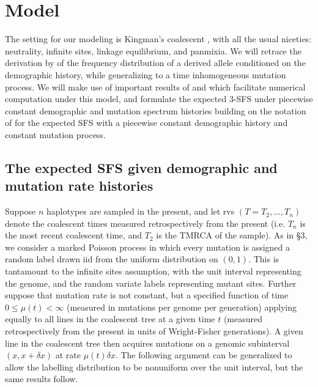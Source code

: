 \documentclass[11pt]{article}
\begin{document}
\section{Model}\label{sec:model}

The setting for our modeling is Kingman's coalescent \citep{Kingman1982-ge, Kingman1982-tf, Kingman1982-ys, Kingman2000-jr}, with all the usual niceties: neutrality, infinite sites, linkage equilibrium, and panmixia.
We will retrace the derivation by \cite{Griffiths1998-qf} of the frequency distribution of a derived allele conditioned on the demographic history, while generalizing to a time inhomogeneous mutation process.
We will make use of important results of \cite{Polanski2003-kg} and \cite{Polanski2003-ll} which facilitate numerical computation under this model, and formulate the expected 3-SFS under piecewise constant demographic and mutation spectrum histories building on the notation of \cite{Rosen2018-bb} for the expected SFS with a piecewise constant demographic history and constant mutation process.

\subsection{The expected SFS given demographic and mutation rate histories}\label{sec:model:xi}

Suppose $n$ haplotypes are sampled in the present, and let rvs $(T = T_2,\dots,T_n)$ denote the coalescent times measured retrospectively from the present (i.e. $T_n$ is the most recent coalescent time, and $T_2$ is the TMRCA of the sample).
As in \cite{Griffiths1998-qf} \S3, we consider a marked Poisson process in which every mutation is assigned a random label drawn iid from the uniform distribution on $(0,1)$.
This is tantamount to the infinite sites assumption, with the unit interval representing the genome, and the random variate labels representing mutant sites.
Further suppose that mutation rate is not constant, but a specified function of time $0\le \mu(t)<\infty$ (measured in mutations per genome per generation) applying equally to all lines in the coalescent tree at a given time $t$ (measured retrospectively from the present in units of Wright-Fisher generations).
A given line in the coalescent tree then acquires mutations on a genomic subinterval $(x,x+\delta x)$ at rate $\mu(t)\delta x$.
The following argument can be generalized to allow the labelling distribution to be nonuniform over the unit interval, but the same results follow.
\end{document}
